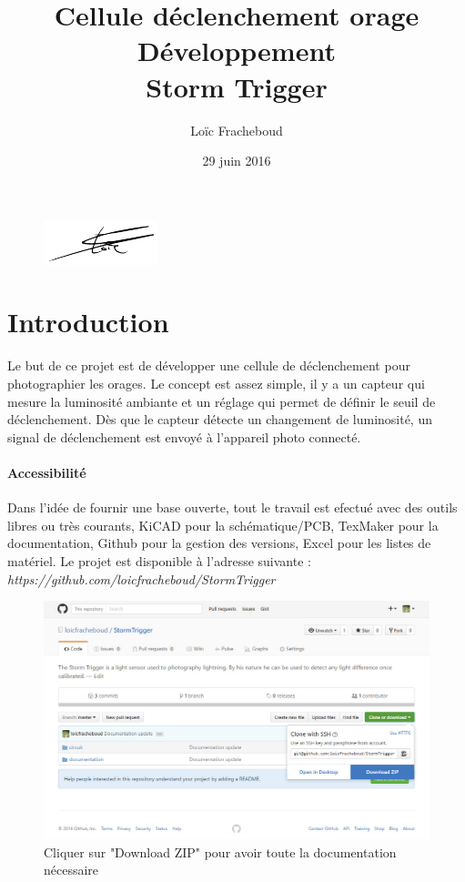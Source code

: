 \documentclass[a4paper,10pt]{article}
\author{Loïc Fracheboud}
\title{Cellule déclenchement orage \\ Développement \\ \Huge Storm Trigger}
\date{29 juin 2016}
\begin{document}
 \maketitle

 \begin{figure}[!h]
 \centering
 \vspace{80pt}
 \includegraphics[scale=0.2]{images/signfracheboud}
 \end{figure}
 \pagebreak
 
 \section{Introduction}
  Le but de ce projet est de développer une cellule de déclenchement pour photographier les orages. Le concept est assez simple, il y a un capteur qui mesure la luminosité ambiante et un réglage qui permet de définir le seuil de déclenchement. Dès que le capteur détecte un changement de luminosité, un signal de déclenchement est envoyé à l'appareil photo connecté. \\

 \paragraph{Accessibilité}
 Dans l'idée de fournir une base ouverte, tout le travail est efectué avec des outils libres ou très courants, KiCAD pour la schématique/PCB, TexMaker pour la documentation, Github pour la gestion des versions, Excel pour les listes de matériel.
Le projet est disponible à l'adresse suivante : {\itshape https://github.com/loicfracheboud/StormTrigger}
  \begin{figure}[!h]
 \centering
 \vspace{5pt}
 \includegraphics[scale=0.25]{images/git_dl}
 \caption{Cliquer sur "Download ZIP" pour avoir toute la documentation nécessaire}
 \end{figure}
  \pagebreak
\end{document}
